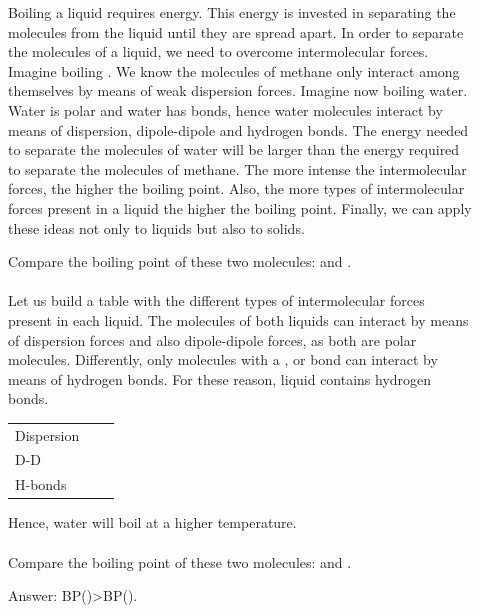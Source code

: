 \documentclass[main.tex]{subfiles}
\begin{document}
\begin{description}
\item[] Boiling a liquid requires energy. This energy is invested in separating the molecules from the liquid until they are spread apart. In order to separate the molecules of a liquid, we need to overcome intermolecular forces. Imagine boiling . We know the molecules of methane only interact among themselves by means of weak dispersion forces. Imagine now boiling water. Water is polar and water has  bonds, hence water molecules interact by means of dispersion, dipole-dipole and hydrogen bonds. The energy needed to separate the molecules of water will be larger than the energy required to separate the molecules of methane. The more intense the intermolecular forces, the higher the boiling point. Also, the more types of intermolecular forces present in a liquid the higher the boiling point. Finally, we can apply these ideas not only to liquids but also to solids.
\begin{example} %
Compare the boiling point of these two molecules:  and .
\\
\\
Let us build a table with the different types of intermolecular forces present in each liquid. The molecules of both liquids can interact by means of dispersion forces and also dipole-dipole forces, as both are polar molecules. Differently, only molecules with a  ,  or  bond can interact by means of hydrogen bonds. For these reason,   liquid contains  hydrogen bonds.\\
\begin{tabularx}{\textwidth}{
    >{\centering}m{.185\linewidth} 
    *{2}{Y} }
  \toprule
 &     &    \\
    \midrule
   Dispersion & 	\checkmark &	\checkmark	  		   \\
  D-D&  \checkmark	 &	\checkmark	 	     \\
      H-bonds & 	\xmark  &\checkmark 		   		\\    
    \bottomrule
\end{tabularx}
Hence, water will boil at a higher temperature.
\\
\faDiamond\ \\
Compare the boiling point of these two molecules:  and .
\begin{flushright} Answer: BP()>BP().\end{flushright}
\end{example}%
\end{description}
\end{document}

